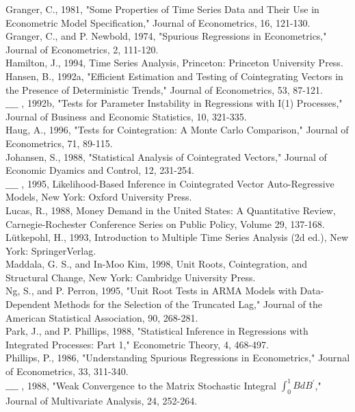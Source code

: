 \documentclass[10pt]{article}
\begin{document}
Granger, C., 1981, "Some Properties of Time Series Data and Their Use in Econometric Model Specification," Journal of Econometrics, 16, 121-130.\\
Granger, C., and P. Newbold, 1974, "Spurious Regressions in Econometrics," Journal of Econometrics, 2, 111-120.\\
Hamilton, J., 1994, Time Series Analysis, Princeton: Princeton University Press.\\
Hansen, B., 1992a, "Efficient Estimation and Testing of Cointegrating Vectors in the Presence of Deterministic Trends," Journal of Econometrics, 53, 87-121.\\
$\_\_\_\_$ , 1992b, "Tests for Parameter Instability in Regressions with I(1) Processes," Journal of Business and Economic Statistics, 10, 321-335.\\
Haug, A., 1996, "Tests for Cointegration: A Monte Carlo Comparison," Journal of Econometrics, 71, 89-115.\\
Johansen, S., 1988, "Statistical Analysis of Cointegrated Vectors," Journal of Economic Dyamics and Control, 12, 231-254.\\
$\_\_\_\_$ , 1995, Likelihood-Based Inference in Cointegrated Vector Auto-Regressive Models, New York: Oxford University Press.\\
Lucas, R., 1988, Money Demand in the United States: A Quantitative Review, Carnegie-Rochester Conference Series on Public Policy, Volume 29, 137-168.\\
Lütkepohl, H., 1993, Introduction to Multiple Time Series Analysis (2d ed.), New York: SpringerVerlag.\\
Maddala, G. S., and In-Moo Kim, 1998, Unit Roots, Cointegration, and Structural Change, New York: Cambridge University Press.\\
Ng, S., and P. Perron, 1995, "Unit Root Tests in ARMA Models with Data-Dependent Methods for the Selection of the Truncated Lag," Journal of the American Statistical Association, 90, 268-281.\\
Park, J., and P. Phillips, 1988, "Statistical Inference in Regressions with Integrated Processes: Part 1," Econometric Theory, 4, 468-497.\\
Phillips, P., 1986, "Understanding Spurious Regressions in Econometrics," Journal of Econometrics, 33, 311-340.\\
$\_\_\_\_$ , 1988, "Weak Convergence to the Matrix Stochastic Integral $\int_{0}^{1} B d B^{\prime}$," Journal of Multivariate Analysis, 24, 252-264.\\
\end{document}
